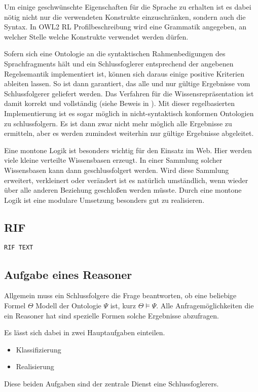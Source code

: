 Um einige geschwünschte Eigenschaften für die Sprache zu erhalten ist es dabei nötig nicht nur die verwendeten Konstrukte einzuschränken, sondern auch die Syntax. In OWL2 RL Profilbeschreibung wird eine Grammatik angegeben, an welcher Stelle welche Konstrukte verwendet werden dürfen.

Sofern sich eine Ontologie an die syntaktischen Rahmenbedigungen des Sprachfragments hält und ein Schlussfoglerer entsprechend der angebenen Regelsemantik implementiert ist, können sich daraus einige positive Kriterien ableiten lassen. So ist dann garantiert, das alle und nur gültige Ergebnisse vom Schlussfolgerer geliefert werden. Das Verfahren für die Wissensrepräsentation ist damit korrekt und vollständig (siehe Beweis in \cite{OWL2Profiles}).
Mit dieser regelbasierten Implementierung ist es sogar möglich in nicht-syntaktisch konformen Ontologien zu schlussfolgern. Es ist dann zwar nicht mehr möglich alle Ergebnisse zu ermitteln, aber es werden zumindest weiterhin nur gültige Ergebnisse abgeleitet.

Eine montone Logik ist besonders wichtig für den Einsatz im Web. Hier werden viele kleine verteilte Wissensbasen erzeugt. In einer Sammlung solcher Wissensbasen kann dann geschlussfolgert werden. Wird diese Sammlung erweitert, verkleinert oder verändert ist es natürlich umständlich, wenn wieder über alle anderen Beziehung geschloßen werden müsste. Durch eine montone Logik ist eine modulare Umsetzung besonders gut zu realisieren.


\subsection{RIF}
\begin{verbatim}
RIF TEXT
\end{verbatim}


\subsection{Aufgabe eines Reasoner}
Allgemein muss ein Schlussfolgere die Frage beantworten, ob eine beliebige Formel $\Theta$ Modell der Ontologie $\Psi$ ist, kurz $\Theta \models \Psi$. Alle Anfragemöglichkeiten die ein Reasoner hat sind spezielle Formen solche Ergebnisse abzufragen.

Es lässt sich dabei in zwei Hauptaufgaben einteilen.
\begin{itemize}
  \item Klassifizierung
  \item Realisierung
\end{itemize}
Diese beiden Aufgaben sind der zentrale Dienst eine Schlussfoglerers. 

